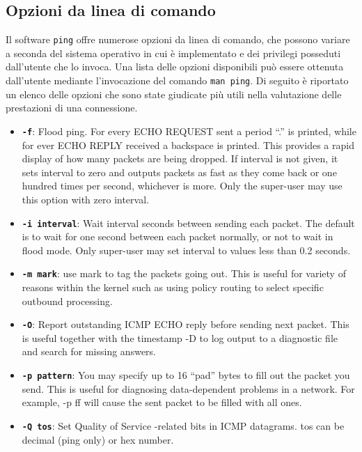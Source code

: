 \documentclass[a4paper,10pt]{article}
\begin{document}
\subsection{Opzioni da linea di comando}
Il software \texttt{ping} offre numerose opzioni da linea di comando, che possono variare a seconda del sistema operativo in cui è implementato e dei privilegi posseduti dall'utente che lo invoca. Una lista delle opzioni disponibili può essere ottenuta dall'utente mediante l'invocazione del comando \texttt{man ping}. Di seguito è riportato un elenco delle opzioni che sono state giudicate più utili nella valutazione delle prestazioni di una connessione.
\begin{itemize}

\item \textbf{\texttt{-f}}: Flood ping. For every ECHO REQUEST sent a period “.” is printed, while for ever ECHO REPLY received a backspace is printed. This provides a rapid display of how many packets are being dropped. If interval is not given, it sets interval to zero and outputs packets as fast as they come back or one hundred times per second, whichever is more. Only the super-user may use this option with zero interval.

\item \textbf{\texttt{-i interval}}: Wait interval seconds between sending each packet. The default is to wait for one second between each packet normally, or not to wait in flood mode. Only super-user may set interval to values less than 0.2 seconds.

\item \textbf{\texttt{-m mark}}: use mark to tag the packets going out. This is useful for variety of reasons within the kernel such as using policy routing to select specific outbound processing.

\item \textbf{\texttt{-O}}: Report outstanding ICMP ECHO reply before sending next packet. This is useful together with the timestamp -D to log output to a diagnostic file and search for missing answers.

\item \textbf{\texttt{-p pattern}}: You may specify up to 16 “pad” bytes to fill out the packet you send. This is useful for diagnosing data-dependent problems in a network. For example, -p ff will cause the sent packet to be filled with all ones.

\item \textbf{\texttt{-Q tos}}: Set Quality of Service -related bits in ICMP datagrams.  tos can be decimal (ping only) or hex number.


\end{itemize}
\end{document}
